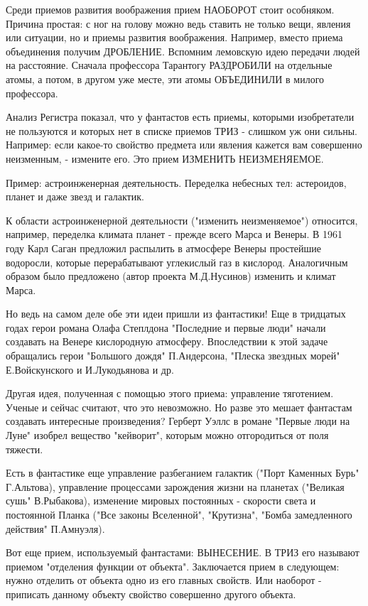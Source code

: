 \documentclass[11pt,a4paper]{article}
\begin{document}
Среди приемов развития воображения прием НАОБОРОТ стоит особняком. Причина простая: с ног на голову можно ведь ставить не только вещи, явления или ситуации, но и приемы развития воображения. Например, вместо приема объединения получим ДРОБЛЕНИЕ. Вспомним лемовскую идею передачи людей на расстояние. Сначала профессора Тарантогу РАЗДРОБИЛИ на отдельные атомы, а потом, в другом уже месте, эти атомы ОБЪЕДИНИЛИ в милого профессора.

Анализ Регистра показал, что у фантастов есть приемы, которыми изобретатели не пользуются и которых нет в списке приемов ТРИЗ - слишком уж они сильны. Например: если какое-то свойство предмета или явления кажется вам совершенно неизменным, - измените его. Это прием ИЗМЕНИТЬ НЕИЗМЕНЯЕМОЕ.

Пример: астроинженерная деятельность. Переделка небесных тел: астероидов, планет и даже звезд и галактик.

К области астроинженерной деятельности ("изменить неизменяемое") относится, например, переделка климата планет - прежде всего Марса и Венеры. В 1961 году Карл Саган предложил распылить в атмосфере Венеры простейшие водоросли, которые перерабатывают углекислый газ в кислород. Аналогичным образом было предложено (автор проекта М.Д.Нусинов) изменить и климат Марса.

Но ведь на самом деле обе эти идеи пришли из фантастики! Еще в тридцатых годах герои романа Олафа Степлдона "Последние и первые люди" начали создавать на Венере кислородную атмосферу. Впоследствии к этой задаче обращались герои "Большого дождя" П.Андерсона, "Плеска звездных морей" Е.Войскунского и И.Лукодьянова и др.

Другая идея, полученная с помощью этого приема: управление тяготением. Ученые и сейчас считают, что это невозможно. Но разве это мешает фантастам создавать интересные произведения? Герберт Уэллс в романе "Первые люди на Луне" изобрел вещество "кейворит", которым можно отгородиться от поля тяжести.

Есть в фантастике еще управление разбеганием галактик ("Порт Каменных Бурь" Г.Альтова), управление процессами зарождения жизни на планетах ("Великая сушь" В.Рыбакова), изменение мировых постоянных - скорости света и постоянной Планка ("Все законы Вселенной", "Крутизна", "Бомба замедленного действия" П.Амнуэля).

Вот еще прием, используемый фантастами: ВЫНЕСЕНИЕ. В ТРИЗ его называют приемом "отделения функции от объекта". Заключается прием в следующем: нужно отделить от объекта одно из его главных свойств. Или наоборот - приписать данному объекту свойство совершенно другого объекта.
\end{document}
